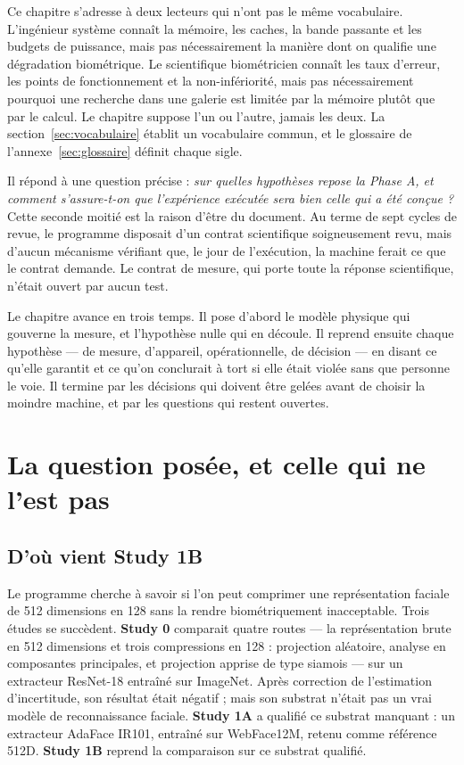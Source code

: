 \documentclass[11pt,a4paper]{article}
\begin{document}
Ce chapitre s'adresse à deux lecteurs qui n'ont pas le même vocabulaire. L'ingénieur
système connaît la mémoire, les caches, la bande passante et les budgets de
puissance, mais pas nécessairement la manière dont on qualifie une dégradation
biométrique. Le scientifique biométricien connaît les taux d'erreur, les points de
fonctionnement et la non-infériorité, mais pas nécessairement pourquoi une recherche
dans une galerie est limitée par la mémoire plutôt que par le calcul. Le
chapitre suppose l'un ou l'autre, jamais les deux. La section~\ref{sec:vocabulaire}
établit un vocabulaire commun, et le glossaire de l'annexe~\ref{sec:glossaire}
définit chaque sigle.

Il répond à une question précise : \emph{sur quelles hypothèses repose la Phase A,
et comment s'assure-t-on que l'expérience exécutée sera bien celle qui a été
conçue ?} Cette seconde moitié est la raison d'être du document. Au terme de sept
cycles de revue, le programme disposait d'un contrat scientifique soigneusement
revu, mais d'aucun mécanisme vérifiant que, le jour de l'exécution, la machine
ferait ce que le contrat demande. Le contrat de mesure, qui porte toute la
réponse scientifique, n'était ouvert par aucun test.

Le chapitre avance en trois temps. Il pose d'abord le modèle physique qui gouverne
la mesure, et l'hypothèse nulle qui en découle. Il reprend ensuite chaque
hypothèse — de mesure, d'appareil, opérationnelle, de décision — en disant ce
qu'elle garantit et ce qu'on conclurait à tort si elle était violée sans que
personne le voie. Il termine par les décisions qui doivent être gelées avant de
choisir la moindre machine, et par les questions qui restent ouvertes.

\section{La question posée, et celle qui ne l'est pas}

\subsection{D'où vient Study 1B}

Le programme cherche à savoir si l'on peut comprimer une représentation faciale de
512 dimensions en 128 sans la rendre biométriquement inacceptable. Trois études se
succèdent. \textbf{Study 0} comparait quatre routes — la représentation brute en
512 dimensions et trois compressions en 128 : projection aléatoire, analyse en
composantes principales, et projection apprise de type siamois — sur un extracteur
ResNet-18 entraîné sur ImageNet. Après correction de l'estimation d'incertitude, son
résultat était négatif ; mais son substrat n'était pas un vrai modèle de
reconnaissance faciale. \textbf{Study 1A} a qualifié ce substrat manquant : un
extracteur AdaFace IR101, entraîné sur WebFace12M, retenu comme référence 512D.
\textbf{Study 1B} reprend la comparaison sur ce substrat qualifié.
\end{document}
